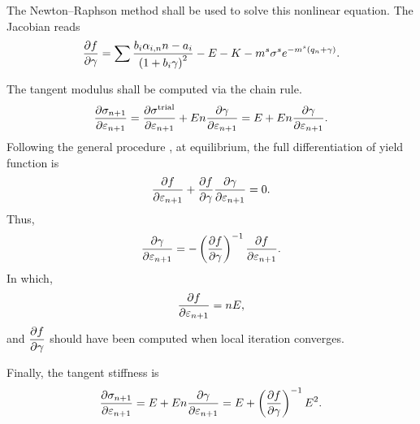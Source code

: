 The Newton--Raphson method shall be used to solve this nonlinear equation. The Jacobian reads
\begin{gather}\label{eq:af_pfpg}
\dfrac{\partial{f}}{\partial{\gamma}}=\sum\dfrac{b_i\alpha_{i,n}n-a_i}{\left(1+b_i\gamma\right)^2}-E-K-m^s\sigma^se^{-m^s\left(q_n+\gamma\right)}.
\end{gather}

The tangent modulus shall be computed via the chain rule.
\begin{gather}
\dfrac{\partial{\sigma_{n+1}}}{\partial{\varepsilon_{n+1}}}=\dfrac{\partial{\sigma^\text{trial}}}{\partial{\varepsilon_{n+1}}}+En\dfrac{\partial{\gamma}}{\partial{\varepsilon_{n+1}}}=E+En\dfrac{\partial{\gamma}}{\partial{\varepsilon_{n+1}}}.
\end{gather}
Following the general procedure , at equilibrium, the full differentiation of yield function is
\begin{gather}
\dfrac{\partial{f}}{\partial{\varepsilon_{n+1}}}+\dfrac{\partial{f}}{\partial{\gamma}}\dfrac{\partial{\gamma}}{\partial{\varepsilon_{n+1}}}=0.
\end{gather}
Thus,
\begin{gather}
\dfrac{\partial{\gamma}}{\partial{\varepsilon_{n+1}}}=-\left(\dfrac{\partial{f}}{\partial{\gamma}}\right)^{-1}\dfrac{\partial{f}}{\partial{\varepsilon_{n+1}}}.
\end{gather}
In which,
\begin{gather}
\dfrac{\partial{f}}{\partial{\varepsilon_{n+1}}}=nE,
\end{gather}
and $\dfrac{\partial{f}}{\partial{\gamma}}$ should have been computed when local iteration converges.

Finally, the tangent stiffness is
\begin{gather}
\dfrac{\partial{\sigma_{n+1}}}{\partial{\varepsilon_{n+1}}}=E+En\dfrac{\partial{\gamma}}{\partial{\varepsilon_{n+1}}}=E+\left(\dfrac{\partial{f}}{\partial{\gamma}}\right)^{-1}E^2.
\end{gather}
